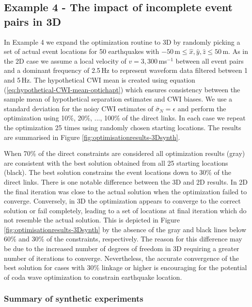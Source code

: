\documentclass[extra, onecolumn, doublespacing]{gji}
\begin{document}
\subsection{Example 4 - The impact of incomplete event pairs in 3D}

In Example 4 we expand the optimization routine to 3D by randomly
picking
 a set of actual event locations for 50 earthquakes with
$-50$\,m$\leq \hat{x},\hat{y},\hat{z} \leq 50$\,m. As in the 2D case
we assume a local velocity of $v=3,300\,$ms$^{-1}$ between all event
pairs and a dominant frequency of 2.5$\,$Hz to represent
 waveform data filtered between 1 and 5$\,$Hz.
The hypothetical CWI mean is created using equation
(\ref{eq:hypothetical-CWI-mean-optichapt}) which ensures consistency
between the sample mean of hypothetical separation estimates and CWI
biases. We use a standard deviation for the noisy CWI estimates of
$\bar{\sigma}_N = \epsilon$ and perform the optimization
using 10\%, 20\%, ..., 100\% of the direct links. In each case we
repeat the optimization 25 times using randomly chosen starting
locations. The results are summarised in Figure
\ref{fig:optimisationresults-3Dsynth}.


When 70\% of the direct constraints are considered all optimization
results (gray) are consistent with the best solution obtained from
all 25 starting locations (black). The
best solution constrains the event locations down to 30\% of the
direct links. There is one notable difference between the 3D and 2D results. In 2D
the final iteration was close to the actual solution when the
optimization failed to converge. Conversely, in 3D the optimization
appears to converge to the correct solution or fail completely,
leading to a set of locations at final iteration which do not
resemble the actual solution. This is depicted in Figure
\ref{fig:optimisationresults-3Dsynth} by the absence of the gray and
black lines below 60\% and 30\% of the constraints, respectively.
The reason for this difference may be due to the increased number of
degrees of freedom in 3D requiring a greater number of iterations to
converge. Nevertheless, the accurate convergence of the best
solution for cases with 30\% linkage or higher is encouraging for
the potential of coda wave optimization to constrain earthquake
location.

\subsubsection{Summary of synthetic experiments}
\end{document}
